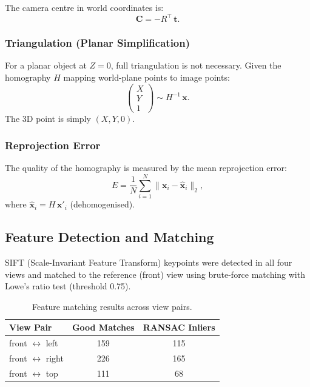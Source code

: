 \documentclass[12pt, a4paper]{article}
\begin{document}
The camera centre in world coordinates is:
\begin{equation}
  \mathbf{C} = -R^\top\,\mathbf{t}.
  \label{eq:cam_centre}
\end{equation}

\subsubsection{Triangulation (Planar Simplification)}

For a planar object at $Z=0$, full triangulation is not necessary. Given the homography $H$ mapping world-plane points to image points:
\begin{equation}
  \begin{pmatrix}X \\ Y \\ 1\end{pmatrix} \sim H^{-1}\,\mathbf{x}.
\end{equation}
The 3D point is simply $(X, Y, 0)$.

\subsubsection{Reprojection Error}

The quality of the homography is measured by the mean reprojection error:
\begin{equation}
  E = \frac{1}{N}\sum_{i=1}^{N} \|\mathbf{x}_i - \hat{\mathbf{x}}_i\|_2,
\end{equation}
where $\hat{\mathbf{x}}_i = H\,\mathbf{x}'_i$ (dehomogenised).


\subsection{Feature Detection and Matching}

SIFT (Scale-Invariant Feature Transform) keypoints were detected in all four views and matched to the reference (front) view using brute-force matching with Lowe's ratio test (threshold 0.75).

\begin{table}[H]
\centering
\begin{tabular}{lcc}
\toprule
\textbf{View Pair} & \textbf{Good Matches} & \textbf{RANSAC Inliers}\\
\midrule
front $\leftrightarrow$ left & 159 & 115\\
front $\leftrightarrow$ right & 226 & 165\\
front $\leftrightarrow$ top & 111 & 68\\
\bottomrule
\end{tabular}
\caption{Feature matching results across view pairs.}
\label{tab:matches}
\end{table}
\end{document}
